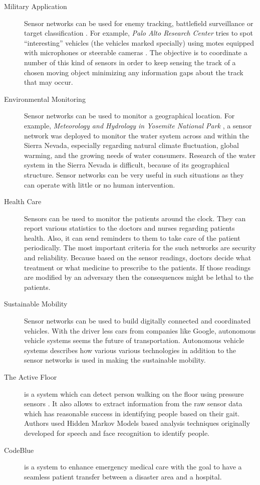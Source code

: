 	\begin{description}
		\item[Military Application]
			Sensor networks can be used for enemy tracking, battlefield surveillance or target classification \cite{li2002detection}.
			For example, \textit{Palo Alto Research Center} tries to spot ``interesting'' vehicles (the vehicles marked specially) using motes equipped with microphones or steerable cameras \cite{chu2004distributed}.
			The objective is to coordinate a number of this kind of sensors in order to keep sensing the track of a chosen moving object minimizing any information gaps about the track that may occur.

		\item[Environmental Monitoring] 
			Sensor networks can be used to monitor a geographical location. 
			For example, \textit{Meteorology and Hydrology in Yosemite National Park} \cite{lundquist2003meteorology}, a sensor network was deployed to monitor the water system across and within the Sierra Nevada, especially regarding natural climate fluctuation, global warming, and the growing needs of water consumers.
			Research of the water system in the Sierra Nevada is difficult, because of its geographical structure.
			Sensor networks can be very useful in such situations as they can operate with little or no human intervention.
		
		\item[Health Care]
			Sensors can be used to monitor the patients around the clock. 
			They can report various statistics to the doctors and nurses regarding patients health.
			Also, it can send reminders to them to take care of the patient periodically. 	
			The most important criteria for the such networks are security and reliability.
			Because based on the sensor readings, doctors decide what treatment or what medicine to prescribe to the patients.
			If those readings are modified by an adversary then the consequences might be lethal to the patients.

		\item[Sustainable Mobility]
			Sensor networks can be used to build digitally connected and coordinated vehicles.
			With the driver less cars from companies like Google, autonomous vehicle systems seems the future of transportation.
			Autonomous vehicle systems \cite{benenson2008towards} describes how various various technologies in addition to the sensor networks is used in making the sustainable mobility.
		
		\item[The Active Floor]
			is a system which can detect person walking on the floor using pressure sensors \cite{addlesee1997orl}.
			It also allows to extract information from the raw sensor data which has reasonable success in identifying people based on their gait.
			Authors used Hidden Markov Models based analysis techniques originally developed for speech and face recognition to identify people.
		
		\item[CodeBlue]
			is a system to enhance emergency medical care with the goal to have a seamless patient transfer between a disaster area and a hospital\cite{lorincz2004sensor}.
	\end{description}
	
